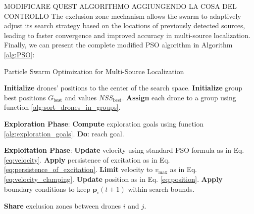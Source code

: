 MODIFICARE QUEST ALGORITHMO AGGIUNGENDO LA COSA DEL CONTROLLO
The exclusion zone mechanism allows the swarm 
to adaptively adjust its search strategy based on the locations 
of previously detected sources, leading to faster convergence 
and improved accuracy in multi-source localization.
Finally, we can present the complete modified PSO algorithm in 
Algorithm \ref{alg:PSO}: 
\begin{algorithm}
    \caption{Particle Swarm Optimization for Multi-Source Localization}\label{alg:PSO}
    \begin{algorithmic}[1]
        \State \textbf{Initialize} drones' positions to the center of the search space.
        \State \textbf{Initialize} group best positions \( G_{\text{best}} \) and values \(\textit{NSS}_{\text{best}}\).
        \State \textbf{Assign} each drone to a group using function \ref{alg:sort_drones_in_groups}.
        
        \State \textbf{Exploration Phase}:
        \State \textbf{Compute} exploration goals using function \ref{alg:exploration_goals}.
            \State \textbf{Do}: reach goal.
        \EndFor

        \State \textbf{Exploitation Phase}:
                \State \textbf{Update} velocity using standard PSO formula as in Eq.\eqref{eq:velocity}.
                \State \textbf{Apply} persistence of excitation as in Eq. \eqref{eq:persistence_of_excitation}.
                \State \textbf{Limit} velocity to \( v_{\text{max}} \) as in Eq. \eqref{eq:velocity_clamping}.
                \State \textbf{Update} position as in Eq. \eqref{eq:position}.
                \State \textbf{Apply} boundary conditions to keep \(\mathbf{p}_i(t+1)\) within search bounds.
                
                            \State \textbf{Share} exclusion zones between drones \( i \) and \( j \).
                        \EndIf
                    \EndIf
                \EndFor
                

\end{algorithmic}
\end{algorithm}
